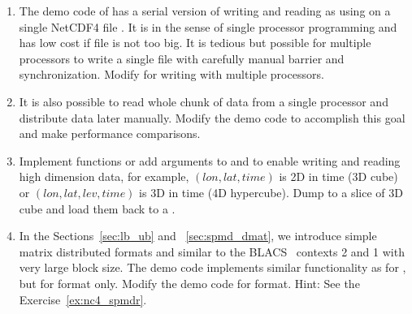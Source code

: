 \begin{enumerate}[label=\thechapter-\arabic*]
\item
The demo code  of  has a serial version
of writing and reading  as using  on a single
NetCDF4 file . It is in the sense of single processor
programming and has low cost if file is not too big.
It is tedious but possible for multiple processors to write
a single file with carefully manual barrier and synchronization.
Modify  for writing with multiple processors.

\item
It is also possible to read whole chunk of data from a single processor
and distribute data later manually. Modify the demo code
 to accomplish this goal and make performance
comparisons.

\item
Implement functions or add arguments to  and
 to enable writing and reading high dimension data,
for example, $(lon, lat, time)$ is 2D in time (3D cube) or
$(lon, lat, lev, time)$ is 3D in time (4D hypercube).
Dump  to a slice of 3D cube and load them back to a
.

\item
In the Sections~\ref{sec:lb_ub} and ~\ref{sec:spmd_dmat}, we introduce
simple matrix distributed formats  and  similar to
the BLACS~ contexts  2 and 1 with very large block size.
The demo code
 implements similar functionality as for
, but for  format only. Modify the demo code for
 format.
{\color{blue}Hint: See the Exercise~\ref{ex:nc4_spmdr}.
}

\end{enumerate}

